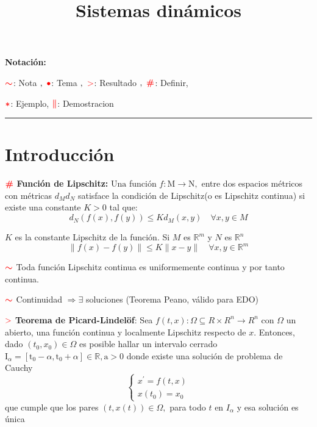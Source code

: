 \documentclass[%
 reprint,
 amsmath,amssymb,
 aps,
]{revtex4-1}
\newcommand{\propiedad}{\textcolor{red}{\mathbf{>}}}
\newcommand{\definir}{\color{red}{\textbf{\#}}}
\newcommand{\tema}{\color{red}{\bullet}}
\newcommand{\nota}{\textcolor{red}{\color{red}{\boldsymbol{\sim}}}}
\newcommand{\ejemplo}{\textcolor{red}{\color{red}{\boldsymbol{*}}}}
\newcommand{\demo}{\textcolor{red}{\color{red}{\boldsymbol{\|}}}}
\newcommand*\sepline{%
  \rule[0.5ex]{.45\textwidth}{.5pt}
}
\begin{document}

\title{Sistemas dinámicos}%


\maketitle


\textbf{Notación:}

$\nota$: Nota
$,\ \tema$: Tema
$,\ \propiedad$: Resultado
$,\ \definir$: Definir,

$\ejemplo$: Ejemplo, $\demo$: Demostracion

\sepline

\section{Introducción}

$\definir$ \textbf{Función de Lipschitz:}
$\mathrm{Una}$ función ${f}: \mathrm{M} \rightarrow \mathrm{N},$ entre dos espacios métricos con métricas $d_{M} d_{N}$ satisface la condición de Lipschitz(o es Lipschitz continua) si existe una constante $K>0$ tal que:
$$
d_{N}(f(x), f(y)) \leq K d_{M}(x, y) \quad \forall x, y \in M
$$

$K$ es la constante Lipschitz de la función.
Si $M$ es $\mathbb{R}^{m}$ y $N$ es $\mathbb{R}^{n}$
$$
\|f(x)-f(y)\| \leq K\|x-y\| \quad \forall x, y \in \mathbb{R}^{m}
$$

$\nota$ Toda función Lipschitz continua es uniformemente continua y por tanto continua.

$\nota$ Continuidad $\Rightarrow \exists$ soluciones (Teorema Peano, válido para EDO) 

$\propiedad$ \textbf{Teorema de Picard-Lindelöf}:
Sea $f(t, x): \Omega \subseteq R \times R^{n} \rightarrow R^{n}$ con $\Omega$ un abierto, una función continua y localmente Lipschitz respecto de $x$. Entonces, dado $\left(t_{0}, x_{0}\right) \in \Omega$ es posible hallar un intervalo cerrado $\mathrm{I}_{\alpha}=\left[\mathrm{t}_{0}-\alpha, \mathrm{t}_{0}+\alpha\right] \in \mathbb{R}, \mathrm{a}>0$ donde existe una
solución de problema de Cauchy
$$
\left\{\begin{array}{l}
x^{\prime}=f(t, x) \\
x\left(t_{0}\right)=x_{0}
\end{array}\right.
$$
que cumple que los pares $(t, x(t)) \in \Omega,$ para todo $t$ en $I_{\alpha}$ y esa solución es única
\end{document}

